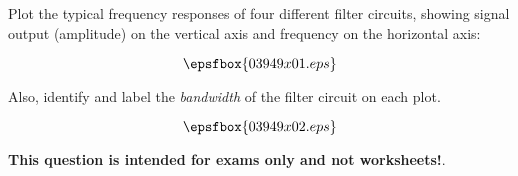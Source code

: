 

Plot the typical frequency responses of four different filter circuits, showing signal output (amplitude) on the vertical axis and frequency on the horizontal axis:

$$\epsfbox{03949x01.eps}$$

Also, identify and label the {\it bandwidth} of the filter circuit on each plot.







$$\epsfbox{03949x02.eps}$$







{\bf This question is intended for exams only and not worksheets!}.



